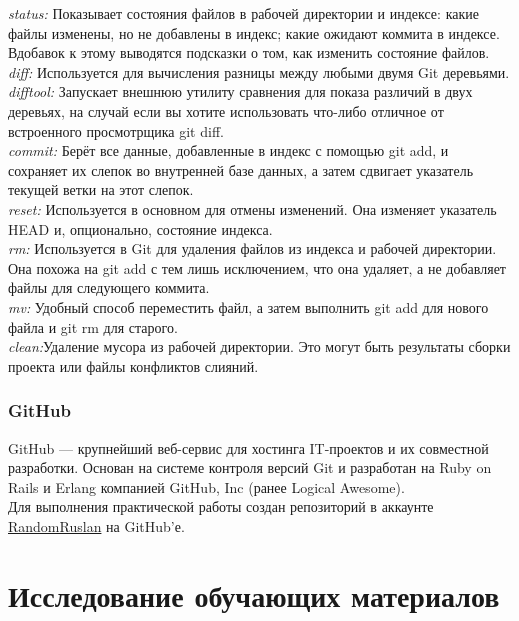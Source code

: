 \documentclass{article}
\begin{document}
		\textit{status:} Показывает состояния файлов в рабочей директории и индексе: какие файлы изменены, но не добавлены в индекс; какие ожидают коммита в индексе. Вдобавок к этому выводятся подсказки о том, как изменить состояние файлов.\\
		
		\textit{diff:} Используется для вычисления разницы между любыми двумя Git деревьями.\\ 
		
		\textit{difftool:} Запускает внешнюю утилиту сравнения для показа различий в двух деревьях, на случай если вы хотите использовать что-либо отличное от встроенного просмотрщика git diff.\\
		
		\textit{commit:} Берёт все данные, добавленные в индекс с помощью git add, и сохраняет их слепок во внутренней базе данных, а затем сдвигает указатель текущей ветки на этот слепок.\\
		
		\textit{reset:} Используется в основном для отмены изменений. Она изменяет указатель HEAD и, опционально, состояние индекса.\\
		
		\textit{rm:} Используется в Git для удаления файлов из индекса и рабочей директории. Она похожа на git add с тем лишь исключением, что она удаляет, а не добавляет файлы для следующего коммита.\\
		
		\textit{mv:} Удобный способ переместить файл, а затем выполнить git add для нового файла и git rm для старого.\\
		
		\textit{clean:}Удаление мусора из рабочей директории. Это могут быть результаты сборки проекта или файлы конфликтов слияний.
		
		\subsubsection{GitHub}
		GitHub — крупнейший веб-сервис для хостинга IT-проектов и их совместной разработки. Основан на системе контроля версий Git и разработан на Ruby on Rails и Erlang компанией GitHub, Inc (ранее Logical Awesome).\\
		
		Для выполнения практической работы создан репозиторий в аккаунте \href{https://github.com/RandomRuslan/SMP_Practice}{RandomRuslan} на GitHub'е.\\
\newpage
\section{Исследование обучающих материалов}
\end{document}
